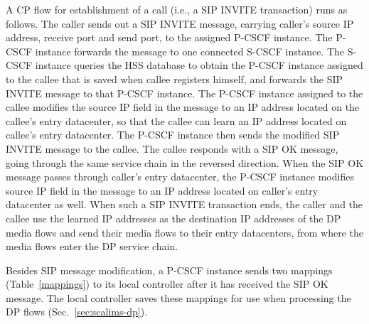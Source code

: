 A CP flow for establishment of a call (i.e., a SIP INVITE transaction) runs as follows.
The caller sends out a SIP INVITE message, carrying caller's source IP address, receive port and send port, to the assigned P-CSCF instance.
The P-CSCF instance forwards the message to one connected S-CSCF instance.  The
S-CSCF instance queries the HSS database to obtain the P-CSCF instance assigned
to the callee that is saved when callee registers himself, and forwards the SIP
INVITE message to that P-CSCF instance. The P-CSCF instance assigned to the
callee modifies the source IP field in the message to an IP address located on
the callee's entry datacenter, so that the callee can learn an IP address
located on callee's entry datacenter. The P-CSCF instance then sends the
modified SIP INVITE message to the callee.  The callee responds with a SIP OK
message, going through the same service chain in the reversed direction. When
the SIP OK message passes through caller's entry datacenter, the P-CSCF instance
modifies source IP field in the message to an IP address located on caller's
entry datacenter as well. When such a SIP INVITE transaction ends, the
caller and the callee use the learned IP addresses as the destination IP addresses of the DP media flows and send their media flows to their entry datacenters, from where the media flows enter the DP service chain.



Besides SIP message modification, a P-CSCF instance sends two mappings (Table~\ref{mappings}) to its local controller after it has received the SIP OK message. The local controller saves these mappings for use when processing the DP flows (Sec.~\ref{sec:scalims-dp}). %



